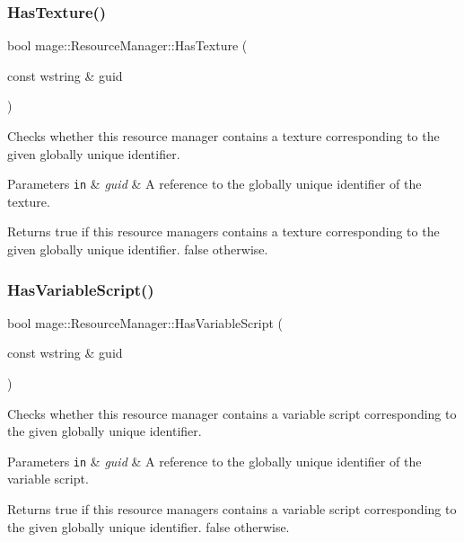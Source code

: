 \subsubsection{\texorpdfstring{Has\+Texture()}{HasTexture()}}
{\footnotesize\ttfamily bool mage\+::\+Resource\+Manager\+::\+Has\+Texture (\begin{DoxyParamCaption}\item[{const wstring \&}]{guid }\end{DoxyParamCaption})\hspace{0.3cm}{\ttfamily [noexcept]}}

Checks whether this resource manager contains a texture corresponding to the given globally unique identifier.


\begin{DoxyParams}[1]{Parameters}
\mbox{\tt in}  & {\em guid} & A reference to the globally unique identifier of the texture. \\
\hline
\end{DoxyParams}
\begin{DoxyReturn}{Returns}
{\ttfamily true} if this resource managers contains a texture corresponding to the given globally unique identifier. {\ttfamily false} otherwise. 
\end{DoxyReturn}
\hypertarget{classmage_1_1_resource_manager_a34d72d4729102af23d73438eea629e02}{}\label{classmage_1_1_resource_manager_a34d72d4729102af23d73438eea629e02} 
\subsubsection{\texorpdfstring{Has\+Variable\+Script()}{HasVariableScript()}}
{\footnotesize\ttfamily bool mage\+::\+Resource\+Manager\+::\+Has\+Variable\+Script (\begin{DoxyParamCaption}\item[{const wstring \&}]{guid }\end{DoxyParamCaption})\hspace{0.3cm}{\ttfamily [noexcept]}}

Checks whether this resource manager contains a variable script corresponding to the given globally unique identifier.


\begin{DoxyParams}[1]{Parameters}
\mbox{\tt in}  & {\em guid} & A reference to the globally unique identifier of the variable script. \\
\hline
\end{DoxyParams}
\begin{DoxyReturn}{Returns}
{\ttfamily true} if this resource managers contains a variable script corresponding to the given globally unique identifier. {\ttfamily false} otherwise. 
\end{DoxyReturn}
\hypertarget{classmage_1_1_resource_manager_ae1245536ca2c0486697b95c89ad3ac44}{}\label{classmage_1_1_resource_manager_ae1245536ca2c0486697b95c89ad3ac44} 
